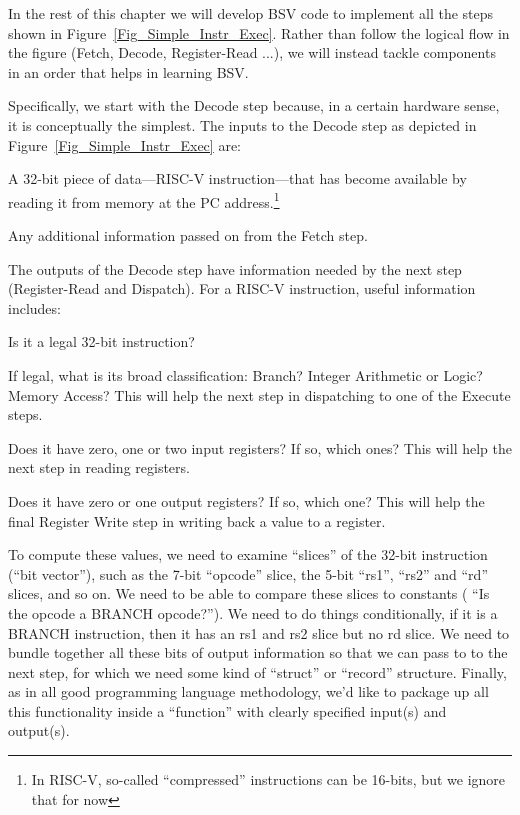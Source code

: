 In the rest of this chapter we will develop BSV code to implement all
the steps shown in Figure~\ref{Fig_Simple_Instr_Exec}.  Rather than
follow the logical flow in the figure (Fetch, Decode, Register-Read
...), we will instead tackle components in an order that helps in
learning BSV.

Specifically, we start with the Decode step because, in a certain
hardware sense, it is conceptually the simplest.  The inputs to the
Decode step as depicted in Figure~\ref{Fig_Simple_Instr_Exec} are:

\begin{tightlist}

 \item A 32-bit piece of data---RISC-V instruction---that has become
 available by reading it from memory at the PC address.\footnote{In
 RISC-V, so-called ``compressed'' instructions can be 16-bits, but we
 ignore that for now}

 \item Any additional information passed on from the Fetch step.

\end{tightlist}

The outputs of the Decode step have information needed by the next
step (Register-Read and Dispatch).  For a RISC-V instruction, useful
information includes:

\begin{tightlist}

 \item Is it a legal 32-bit instruction?

 \item If legal, what is its broad classification: Branch? Integer
   Arithmetic or Logic? Memory Access?  This will help the next step
   in dispatching to one of the Execute steps.

 \item Does it have zero, one or two input registers?  If so, which
   ones?  This will help the next step in reading registers.

 \item Does it have zero or one output registers?  If so, which one?
   This will help the final Register Write step in writing back a
   value to a register.

\end{tightlist}

To compute these values, we need to examine ``slices'' of the 32-bit
instruction (``bit vector''), such as the 7-bit ``opcode'' slice, the
5-bit ``rs1'', ``rs2'' and ``rd'' slices, and so on.  We need to be
able to compare these slices to constants ({\eg} ``Is the opcode a
BRANCH opcode?'').  We need to do things conditionally, {\eg} if it is
a BRANCH instruction, then it has an rs1 and rs2 slice but no rd
slice.  We need to bundle together all these bits of output
information so that we can pass to to the next step, for which we need
some kind of ``struct'' or ``record'' structure.  Finally, as in all
good programming language methodology, we'd like to package up all
this functionality inside a ``function'' with clearly specified
input(s) and output(s).


